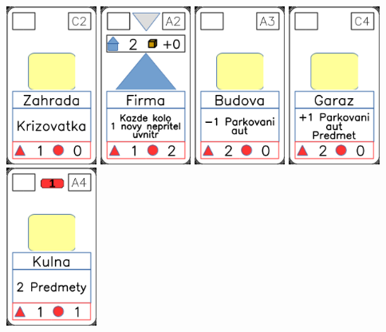 \documentclass[a4paper]{article}
\begin{document}
	\includegraphics[width=3.0cm]{img-2_26}
	\includegraphics[width=3.0cm]{img-3_16}
	\includegraphics[width=3.0cm]{img-2_2}
	\includegraphics[width=3.0cm]{img-2_13}
	\includegraphics[width=3.0cm]{img-2_18}
\end{document}
